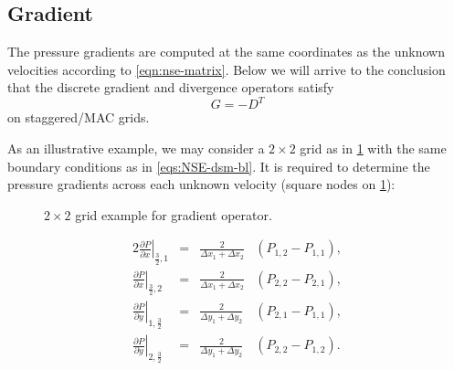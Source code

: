 \documentclass{article}
\numberwithin{equation}{section}
\begin{document}
\subsection{Gradient}\label{subsec:gradient} 

The pressure gradients are computed at the same coordinates as the unknown velocities according to \cref{eqn:nse-matrix}. Below we will arrive to the conclusion that the discrete gradient and divergence operators satisfy
\begin{equation}\label{eqn:g-dt}
  {G}=-{D^T}
\end{equation}
on staggered/MAC grids. 

As an illustrative example, we may consider a $2\times 2$ grid as in \cref{fig:G-example-2x2} with the same boundary conditions as in \cref{eqs:NSE-dsm-bl}. It is required to determine the pressure gradients across each unknown velocity (square nodes on \cref{fig:G-example-2x2}):

\begin{figure}[H] %
  \caption{$2\times 2$ grid example for gradient operator.}\label{fig:G-example-2x2}
\end{figure}

\begin{alignat*}{2}
	\left.\frac{\partial P}{\partial x}\right|_{\frac{3}{2},1} &=&	\frac{2}{{\Delta x_1 + \Delta x_2}}&\left(P_{1,2}-P_{1,1}\right),\\
	\left.\frac{\partial P}{\partial x}\right|_{\frac{3}{2},2} &=&	\frac{2}{{\Delta x_1 + \Delta x_2}}&\left( P_{2,2}-P_{2,1} \right),\\
	\left.\frac{\partial P}{\partial y}\right|_{1,\frac{3}{2}} &=&	\frac{2}{{\Delta y_1 + \Delta y_2}}&\left(P_{2,1}-P_{1,1} \right),\\
	\left.\frac{\partial P}{\partial y}\right|_{2,\frac{3}{2}} &=&	\frac{2}{{\Delta y_1 + \Delta y_2}}&\left( P_{2,2}-P_{1,2} \right).
\end{alignat*}
\end{document}
